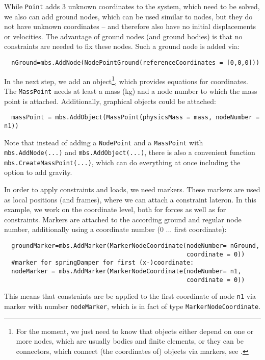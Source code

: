 %
While \texttt{Point} adds 3 unknown coordinates to the system, which need to be solved, we also can add ground nodes, which can be used similar to nodes, but they do not have unknown coordinates -- and therefore also have no initial displacements or velocities. The advantage of ground nodes (and ground bodies) is that no constraints are needed to fix these nodes.
%
Such a ground node is added via:
\pythonstyle\begin{lstlisting}
  nGround=mbs.AddNode(NodePointGround(referenceCoordinates = [0,0,0]))
\end{lstlisting}
%
In the next step, we add an object\footnote{For the moment, we just need to know that objects either depend on one or more nodes, which are usually bodies and finite elements, or they can be connectors, which connect (the coordinates of) objects via markers, see .}, which provides equations for coordinates. The \texttt{MassPoint} needs at least a mass (kg) and a node number to which the mass point is attached. Additionally, graphical objects could be attached:
\pythonstyle\begin{lstlisting}
  massPoint = mbs.AddObject(MassPoint(physicsMass = mass, nodeNumber = n1))
\end{lstlisting}
Note that instead of adding a \texttt{NodePoint} and a \texttt{MassPoint} with \texttt{mbs.AddNode(...)}
and \texttt{mbs.AddObject(...)}, there is also a convenient function \texttt{mbs.CreateMassPoint(...)}, which can do everything at once including the option to add gravity.

In order to apply constraints and loads, we need markers. These markers are used as local positions (and frames), where we can attach a constraint lateron. In this example, we work on the coordinate level, both for forces as well as for constraints.
Markers are attached to the according ground and regular node number, additionally using a coordinate number (0 ... first coordinate):
\pythonstyle\begin{lstlisting}
  groundMarker=mbs.AddMarker(MarkerNodeCoordinate(nodeNumber= nGround, 
                                                  coordinate = 0))
  #marker for springDamper for first (x-)coordinate:
  nodeMarker = mbs.AddMarker(MarkerNodeCoordinate(nodeNumber= n1, 
                                                  coordinate = 0))
\end{lstlisting}
This means that constraints are be applied to the first coordinate of node \texttt{n1} via marker with number \texttt{nodeMarker}, which is in fact of type \texttt{MarkerNodeCoordinate}.

